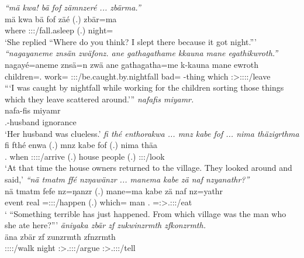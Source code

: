 \begin{exe}
	\emph{``mä kwa! bä fof zämnzeré ... zbärma.''}\\
	\gll mä kwa bä fof zäé (.) zbär=ma\\
	where {\Fut} \Med{} {\Emph} \Fsg:\Sbj:\Rpst:\Pfv/fall.asleep (.) night=\Char\\
	\trans `She replied ``Where do you think? I slept there because it got night.'''
	\emph{``nagayaneme znsän zwäfonz. ane gathagathame kkauna mane egathikwroth.''}\\
	\gll nagayé=aneme znsä=n zwä ane gathagatha=me k-kauna mane ewroth\\
	children=\Poss.{\Nsg} work={\Loc} \Fsg:\Sbj:\Rpst:\Pfv/be.caught.by.nightfall {\Dem} bad={\Ins} \Redup-thing which \Pl:\Sbj>\Stpl:\Obj:\Nonpast:\Ipfv:\Andat/leave\\
	\trans ```I was caught by nightfall while working for the children sorting those things which they leave scattered around.'''
	\emph{nafafis miyamr.}\\
	\gll nafa-fis miyamr\\
	\Third.\Poss-husband ignorance\\
	\trans `Her husband was clueless.'
	\emph{fi thé enthorakwa ... mnz kabe fof ... nima thäzigrthma}\\
	\gll fi fthé enwa (.) mnz kabe fof (.) nima thäa\\
	\Third.{\Abs} when \Stpl:\Sbj:\Pst:\Ipfv:\Venit/arrive (.) house people {\Emph} (.) {\Quot} \Stpl:\Sbj:\Pst:\Pfv/look\\
	\trans `At that time the house owners returned to the village. They looked around and said,'
	\emph{``nä tmatm ffé nzŋawänzr ... manema kabe zä naf nzyanathr?''}\\
	\gll nä tmatm fefe nz=ŋanzr (.) mane=ma kabe zä naf nz=yathr\\
	{\Indf} event real \Immpst=\Stsg:\Sbj:\Nonpast:\Ipfv/happen (.) which={\Char} man {\Prox} \Tsg.{\Erg} \Immpst=\Stsg:\Sbj>\Tsg.\Masc:\Obj:\Nonpast:\Ipfv/eat\\
	\trans ` ``Something terrible has just happened. From which village was the man who she ate here?'''
	\emph{äniyaka zbär zf zukwinzrmth zfkonzrmth.}\\
	\gll äna zbär zf zunzrmth zfnzrmth\\
	\Stpl:\Sbj:\Pst:\Ipfv:\Venit/walk night {\Imm} \Stpl:\Sbj>\Tsg.\F:\Obj:\Pst:\Dur/argue \Stpl:\Sbj>\Tsg.\F:\Obj:\Pst:\Dur/tell\\

\end{exe}

